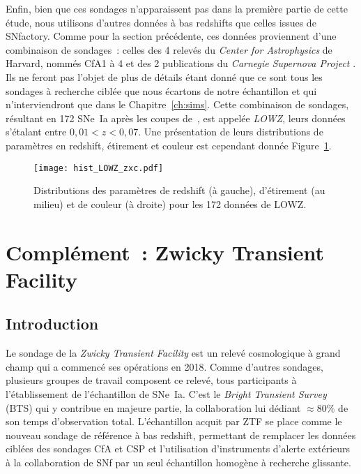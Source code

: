 \documentclass[../main/main.tex]{subfiles}
\begin{document}
Enfin, bien que ces sondages n'apparaissent pas dans la première partie de cette
étude, nous utilisons d'autres données à bas redshifts que celles issues de
SNfactory. Comme pour la section précédente, ces données proviennent d'une
combinaison de sondages~: celles des 4 relevés du \textit{Center for
Astrophysics} de Harvard, nommés CfA1 à 4 \citep{riess1999, jha2006,
hicken2009a, hicken2009b, hicken2012} et des 2 publications du \textit{Carnegie
Supernova Project} \citep[CSP,][]{contreras2010, folatelli2010,
stritzinger2011}. Ils ne feront pas l'objet de plus de détails étant donné que
ce sont tous les sondages à recherche ciblée que nous écartons de notre
échantillon et qui n'interviendront que dans le Chapitre~\ref{ch:sims}. Cette
combinaison de sondages, résultant en 172 SNe~Ia après les coupes
de~\cite{scolnic2018}, est appelée \textit{LOWZ}, leurs données s'étalant entre
$0,01 < z < 0,07$. Une présentation de leurs distributions de paramètres en
redshift, étirement et couleur est cependant donnée Figure~\ref{fig:lowzhist}.

\begin{figure}[ht]
    \centering
    \texttt{[image: hist\_LOWZ\_zxc.pdf]}
    \caption[Distributions des paramètres de redshift, étirement et couleur de
    LOWZ]{Distributions des paramètres de redshift (à gauche), d'étirement (au
    milieu) et de couleur (à droite) pour les 172 données de LOWZ.}
    \label{fig:lowzhist}
\end{figure}

\section{Complément~: Zwicky Transient Facility}\label{sec:ztf}
\subsection{Introduction}\label{ssec:ztfintro}

Le sondage de la \textit{Zwicky Transient Facility} \citep[ZTF,][]{bellm2019,
dekany2020} est un relevé cosmologique à grand champ qui a commencé ses
opérations en 2018. Comme d'autres sondages, plusieurs groupes de travail
composent ce relevé, tous participants à l'établissement de l'échantillon de
SNe~Ia. C'est le \textit{Bright Transient Survey} (BTS) qui y contribue en
majeure partie, la collaboration lui dédiant $\approx 80\%$ de son temps
d'observation total. L'échantillon acquit par ZTF se place comme le nouveau
sondage de référence à bas redshift, permettant de remplacer les données ciblées
des sondages CfA et CSP et l'utilisation d'instruments d'alerte extérieurs à la
collaboration de SNf par un seul échantillon homogène à recherche glissante.
\end{document}

